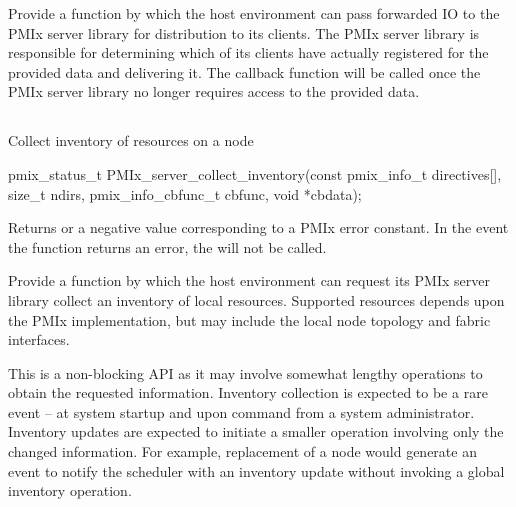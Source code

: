 \descr

Provide a function by which the host environment can pass forwarded \ac{IO} to the \ac{PMIx} server library for distribution to its clients. The \ac{PMIx} server library is responsible for determining which of its clients have actually registered for the provided data and delivering it. The  callback function will be called once the \ac{PMIx} server library no longer requires access to the provided data.

\subsection{}

\summary

Collect inventory of resources on a node

\format

\cspecificstart
\begin{codepar}
pmix_status_t
PMIx_server_collect_inventory(const pmix_info_t directives[],
                              size_t ndirs,
                              pmix_info_cbfunc_t cbfunc,
                              void *cbdata);
\end{codepar}
\cspecificend

\begin{arglist}
\end{arglist}

Returns  or a negative value corresponding to a PMIx error constant. In the event the function returns an error, the  will not be called.

\descr

Provide a function by which the host environment can request its \ac{PMIx} server library collect an inventory of local resources. Supported resources depends upon the \ac{PMIx} implementation, but may include the local node topology and fabric interfaces.

\advicermstart
This is a non-blocking \ac{API} as it may involve somewhat lengthy operations to obtain the requested information. Inventory collection is expected to be a rare event – at system startup and upon command from a system administrator. Inventory updates are expected to initiate a smaller operation involving only the changed information. For example, replacement of a node would generate an event to notify the scheduler with an inventory update without invoking a global inventory operation.
\advicermend

